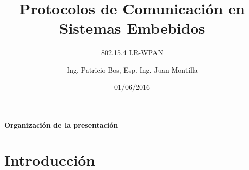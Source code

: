\documentclass[aspectratio=169]{beamer}
\title[802.15.4 LR-WPAN]{Protocolos de Comunicación en Sistemas Embebidos}
\subtitle{802.15.4 LR-WPAN}
\author[]{Ing. Patricio Bos, Esp. Ing. Juan Montilla}
\institute[LSE-FIUBA]{Laboratorio de Sistemas Embebidos - FIUBA}
\date{01/06/2016}
\begin{document}
\begingroup
\makeatletter
\setlength{\hoffset}{-.5\beamer@sidebarwidth}
\makeatother
\begin{frame}
  \titlepage
\end{frame}

\endgroup



\begin{frame}{\textbf{Organización de la presentación}}
  \tableofcontents
\end{frame}
%
%
%
\section{Introducción}
\end{document}
